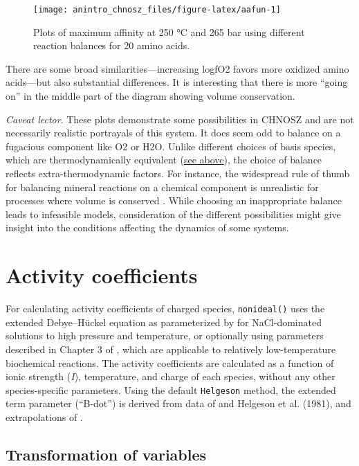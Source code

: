 \documentclass[]{tufte-book}
\begin{document}
\begin{figure}
\texttt{[image: anintro\_chnosz\_files/figure-latex/aafun-1]} \caption[Plots of maximum affinity at 250 °C and 265 bar using different reaction balances for 20 amino acids]{Plots of maximum affinity at 250 °C and 265 bar using different reaction balances for 20 amino acids.}\label{fig:aafun}
\end{figure}

There are some broad similarities---increasing logfO2 favors more
oxidized amino acids---but also substantial differences. It is
interesting that there is more ``going on'' in the middle part of the
diagram showing volume conservation.

\emph{Caveat lector}. These plots demonstrate some possibilities in
CHNOSZ and are not necessarily realistic portrayals of this system. It
does seem odd to balance on a fugacious component like O2 or H2O. Unlike
different choices of basis species, which are thermodynamically
equivalent (\protect\hyperlink{mosaicfun}{see above}), the choice of
balance reflects extra-thermodynamic factors. For instance, the
widespread rule of thumb for balancing mineral reactions on a chemical
component is unrealistic for processes where volume is conserved
\citep{MD98}. While choosing an inappropriate balance leads to
infeasible models, consideration of the different possibilities might
give insight into the conditions affecting the dynamics of some systems.

\chapter{Activity coefficients}\label{activity-coefficients}

For calculating activity coefficients of charged species,
{\texttt{nonideal()}} uses the extended Debye--Hückel equation as
parameterized by \citet{HKF81} for NaCl-dominated solutions to high
pressure and temperature, or optionally using parameters described in
Chapter 3 of \citet{Alb03}, which are applicable to relatively
low-temperature biochemical reactions. The activity coefficients are
calculated as a function of ionic strength (\emph{I}), temperature, and
charge of each species, without any other species-specific parameters.
Using the default \texttt{Helgeson} method, the extended term parameter
(``B-dot'') is derived from data of \citet{Hel69} and Helgeson et al.
(1981), and extrapolations of \citet{MSS13}.

\section{Transformation of variables}\label{transformation-of-variables}
\end{document}
